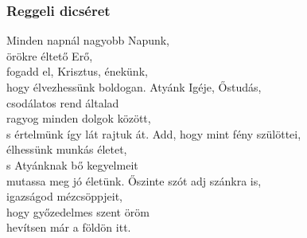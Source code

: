 \documentclass[twoside]{article}
\begin{document}

\subsubsection*{Reggeli dicséret}

\begin{hymnstanzas}
    Minden napnál nagyobb Napunk,\\
    örökre éltető Erő,\\
    fogadd el, Krisztus, énekünk,\\
    hogy élvezhessünk boldogan.
\stanzabreak
    Atyánk Igéje, Őstudás,\\
    csodálatos rend általad\\
    ragyog minden dolgok között,\\
    s értelmünk így lát rajtuk át.
\stanzabreak
    Add, hogy mint fény szülöttei,\\
    élhessünk munkás életet,\\
    s Atyánknak bő kegyelmeit\\
    mutassa meg jó életünk.
\stanzabreak
    Őszinte szót adj szánkra is,\\
    igazságod mézcsöppjeit,\\
    hogy győzedelmes szent öröm\\
    hevítsen már a földön itt.
\end{hymnstanzas}
\end{document}
